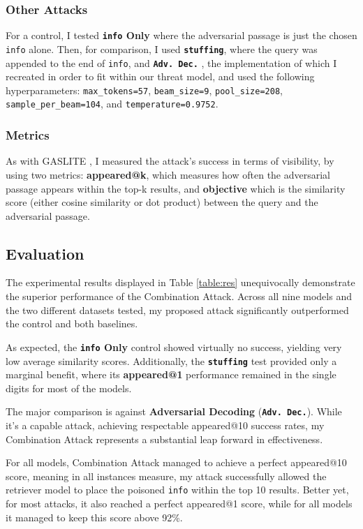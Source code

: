 \documentclass[a4paper, sigconf]{acmart}
\begin{document}
\subsubsection*{Other Attacks} For a control, I tested \textbf{\texttt{info} Only} where the adversarial passage is just the chosen \texttt{info} alone. Then, for comparison, I used \textbf{\texttt{stuffing}}, where the query was appended to the end of \texttt{info}, and \textbf{\texttt{Adv. Dec.}} \cite{advdec}, the implementation of which I recreated in order to fit within our threat model, and used the following hyperparameters: \texttt{max\_tokens=57}, \texttt{beam\_size=9}, \texttt{pool\_size=208}, \\\texttt{sample\_per\_beam=104}, and \texttt{temperature=0.9752}.

\subsubsection*{Metrics} As with GASLITE \cite{bentov2024}, I measured the attack's success in terms of visibility, by using two metrics: \textbf{appeared@k}, which measures how often the adversarial passage appears within the top-k results, and \textbf{objective} which is the similarity score (either cosine similarity or dot product) between the query and the adversarial passage. 


\subsection{Evaluation}

The experimental results displayed in Table \ref{table:res} unequivocally demonstrate the superior performance of the Combination Attack. Across all nine models and the two different datasets tested, my proposed attack significantly outperformed the control and both baselines.

As expected, the \textbf{\texttt{info} Only} control showed virtually no success, yielding very low average similarity scores. Additionally, the \textbf{\texttt{stuffing}} test provided only a marginal benefit, where its \textbf{appeared@1} performance remained in the single digits for most of the models.

The major comparison is against \textbf{Adversarial Decoding} (\textbf{\texttt{Adv. Dec.}}). While it's a capable attack, achieving respectable appeared@10 success rates, my Combination Attack represents a substantial leap forward in effectiveness. 

For all models, Combination Attack managed to achieve a perfect appeared@10 score, meaning in all instances measure, my attack successfully allowed the retriever model to place the poisoned \texttt{info} within the top 10 results. Better yet, for most attacks, it also reached a perfect appeared@1 score, while for all models it managed to keep this score above 92\%. 
\end{document}
